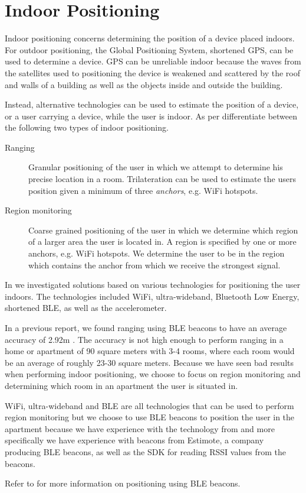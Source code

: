 \section{Indoor Positioning}
\label{sec:analysis:indoor-positioning}

Indoor positioning concerns determining the position of a device placed indoors. For outdoor positioning, the Global Positioning System, shortened GPS, can be used to determine a device. GPS can be unreliable indoor because the waves from the satellites used to positioning the device is weakened and scattered by the roof and walls of a building as well as the objects inside and outside the building.

Instead, alternative technologies can be used to estimate the position of a device, or a user carrying a device, while the user is indoor. As per \cite{prespecialisation} differentiate between the following two types of indoor positioning.

\begin{description}
\item[Ranging] Granular positioning of the user in which we attempt to determine his precise location in a room. Trilateration can be used to estimate the users position given a minimum of three \emph{anchors}, e.g. WiFi hotspots.
\item[Region monitoring] Coarse grained positioning of the user in which we determine which region of a larger area the user is located in. A region is specified by one or more anchors, e.g. WiFi hotspots. We determine the user to be in the region which contains the anchor from which we receive the strongest signal.
\end{description}

In \cite{prespecialisation} we investigated solutions based on various technologies for positioning the user indoors. The technologies included WiFi, ultra-wideband, Bluetooth Low Energy, shortened BLE, as well as the accelerometer.

In a previous report, we found ranging using BLE beacons to have an average accuracy of 2.92m \cite[p. 63]{prespecialisation}. The accuracy is not high enough to perform ranging in a home or apartment of 90 square meters with 3-4 rooms, where each room would be an average of roughly 23-30 square meters. Because we have seen bad results when performing indoor positioning, we choose to focus on region monitoring and determining which room in an apartment the user is situated in.

WiFi, ultra-wideband and BLE are all technologies that can be used to perform region monitoring but we choose to use BLE beacons to position the user in the apartment because we have experience with the technology from \cite{prespecialisation} and more specifically we have experience with beacons from Estimote, a company producing BLE beacons, as well as the SDK for reading RSSI values from the beacons.

Refer to  for more information on positioning using BLE beacons.


